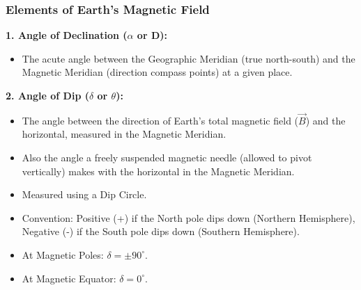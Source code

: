 \transfade[duration=0.5]

\begin{frame}[t]
    \frametitle{\textcolor{deepnavy}{\textbf{Elements of Earth's Magnetic Field}}}
    \renewcommand{\familydefault}{\rmdefault}
    \small

    \item<+-> \textbf{1.   Angle of Declination ($\alpha$ or D):}
        \begin{itemize}[<+->]
              \item The acute angle between the Geographic Meridian (true north-south) and the Magnetic Meridian (direction compass points) at a given place.
        \end{itemize}

    \item<+-> \textbf{2.   Angle of Dip ($\delta$ or $\theta$):}
        \begin{itemize}[<+->]
              \item The angle between the direction of Earth's total magnetic field ($\vec{B}$) and the horizontal, measured in the Magnetic Meridian.
              \item Also the angle a freely suspended magnetic needle (allowed to pivot vertically) makes with the horizontal in the Magnetic Meridian.
              \item Measured using a Dip Circle.
              \item Convention: Positive (+) if the North pole dips down (Northern Hemisphere), Negative (-) if the South pole dips down (Southern Hemisphere).
              \item At Magnetic Poles: $\delta = \pm 90^\circ$.
              \item At Magnetic Equator: $\delta = 0^\circ$.
        \end{itemize}


\end{frame}
